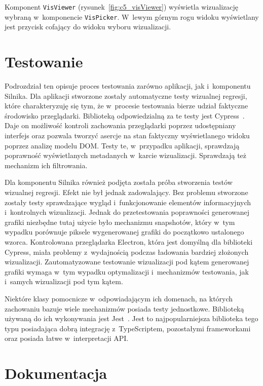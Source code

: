 Komponent \texttt{VisViewer} (rysunek~\ref{fig:c5_visViewer}) wyświetla wizualizację wybraną w~komponencie \texttt{VisPicker}. W~lewym górnym rogu widoku wyświetlany jest przycisk cofający do widoku wyboru wizualizacji.

\section{Testowanie}

Podrozdział ten opisuje proces testowania zarówno aplikacji, jak i~komponentu Silnika. Dla aplikacji stworzone zostały automatyczne testy wizualnej regresji, które charakteryzuję się tym, że w~procesie testowania bierze udział faktyczne środowisko przeglądarki. Biblioteką odpowiedzialną za te testy jest Cypress~\cite{Cypress}. Daje on możliwość kontroli zachowania przeglądarki poprzez udostępniany interfejs oraz pozwala tworzyć asercje na stan faktyczny wyświetlanego widoku poprzez analizę modelu DOM. Testy te, w~przypadku aplikacji, sprawdzają poprawność wyświetlanych metadanych w~karcie wizualizacji. Sprawdzają też mechanizm ich filtrowania.

Dla komponentu Silnika również podjęta została próba stworzenia testów wizualnej regresji. Efekt nie był jednak zadowalający. Bez problemu stworzone zostały testy sprawdzające wygląd i~funkcjonowanie elementów informacyjnych i~kontrolnych wizualizacji. Jednak do przetestowania poprawności generowanej grafiki niezbędne tutaj użycie było mechanizmu snapshotów, który w~tym wypadku porównuje piksele wygenerowanej grafiki do początkowo ustalonego wzorca. Kontrolowana przeglądarka Electron, która jest domyślną dla biblioteki Cypress, miała problemy z~wydajnością podczas ładowania bardziej złożonych wizualizacji. Zautomatyzowane testowanie wizualizacji pod kątem generowanej grafiki wymaga w~tym wypadku optymalizacji i~mechanizmów testowania, jak i~samych wizualizacji pod tym kątem.

Niektóre klasy pomocnicze w~odpowiadającym ich domenach, na których zachowaniu bazuje wiele mechanizmów posiada testy jednostkowe. Biblioteką używaną do ich wykonywania jest Jest~\cite{Jest}. Jest to najpopularniejsza biblioteka tego typu posiadająca dobrą integrację z~TypeScriptem, pozostałymi frameworkami oraz posiada łatwe w~interpretacji API.

\section{Dokumentacja}

